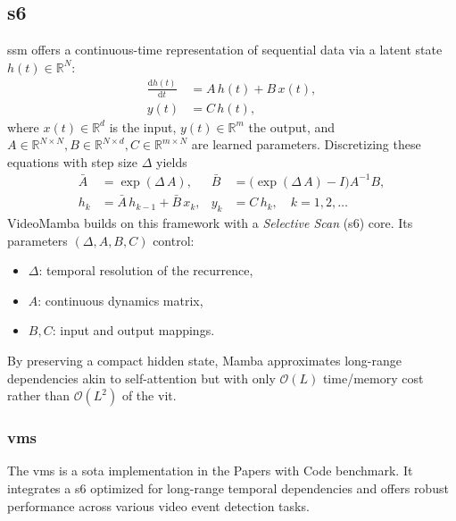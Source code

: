 \subsection{\acrfull{s6}}
\label{ssec:s6}

\acrfull{ssm} offers a continuous-time representation of sequential data via a latent state \(h(t)\in\mathbb{R}^N\):
\begin{align}
    \frac{\mathrm{d}h(t)}{\mathrm{d}t} &= A\,h(t) + B\,x(t),  \label{eq:ssm_continuous1}\\
    y(t) &= C\,h(t),                                    \label{eq:ssm_continuous2}
\end{align}
where \(x(t)\in\mathbb{R}^d\) is the input, \(y(t)\in\mathbb{R}^m\) the output, and \(A\in\mathbb{R}^{N\times N}, B\in\mathbb{R}^{N\times d}, C\in\mathbb{R}^{m\times N}\) are learned parameters.  Discretizing these equations with step size \(\Delta\) yields
\begin{align}
    \bar A &= \exp(\Delta\,A), 
    & 
    \bar B &= \bigl(\exp(\Delta\,A)-I\bigr)A^{-1}B,\\
    h_k &= \bar A\,h_{k-1} + \bar B\,x_k, 
    &
    y_k &= C\,h_k,
    \quad k=1,2,\dots
\end{align}
VideoMamba \cite{li_videomamba_2024} builds on this framework with a \emph{Selective Scan} (\acrshort{s6}) core. Its parameters \((\Delta, A,B,C)\) control:
\begin{itemize}
    \item \(\Delta\): temporal resolution of the recurrence,
    \item \(A\): continuous dynamics matrix,
    \item \(B,C\): input and output mappings.
\end{itemize}

By preserving a compact hidden state, Mamba approximates long-range dependencies akin to self-attention but with only \(\mathcal{O}(L)\) time/memory cost rather than \(\mathcal{O}(L^2)\) of the \acrlong{vit}.  

\subsubsection{\acrfull{vms}}
The \acrfull{vms} is a \acrfull{sota} implementation in the Papers with Code benchmark. It integrates a \acrlong{s6} optimized for long-range temporal dependencies and offers robust performance across various video event detection tasks. 

